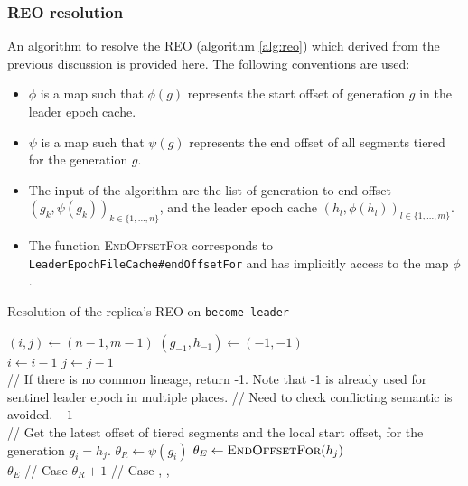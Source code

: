 \documentclass{article}
\newcommand*\circled[1]{\tikz[baseline=(char.base)]{
		\node[shape=circle,draw,inner sep=1pt] (char) {#1};}}
\begin{document}
\subsubsection{REO resolution}

An algorithm to resolve the REO (algorithm \ref{alg:reo}) which derived from the previous discussion is provided here. The following conventions are used:

\begin{itemize}
	\item $\phi$ is a map such that $\phi(g)$ represents the start offset of generation $g$ in the leader epoch cache.
	\item $\psi$ is a map such that $\psi(g)$ represents the end offset of all segments tiered for the generation $g$.
	\item The input of the algorithm are the list of generation to end offset $(g_k, \psi(g_k))_{k \in \{1,...,n\}}$, and the leader epoch cache $(h_l, \phi(h_l))_{l \in \{1,...,m\}}$.
	\item The function \textsc{EndOffsetFor} corresponds to \texttt{LeaderEpochFileCache\#endOffsetFor} and has implicitly access to the map $\phi$.
\end{itemize} 

\begin{algorithm}[h!]
	\caption{Resolution of the replica's REO on \texttt{become-leader}}
	\label{alg:reo}
	
	\begin{algorithmic}[1]
			\State	$(i,j) \leftarrow (n-1,m-1)$
			\State	$(g_{-1}, h_{-1}) \leftarrow (-1,-1)$
			\\
					\State $i \leftarrow i - 1$
				\EndWhile
					\State $j \leftarrow j - 1$
				\EndWhile
			\EndWhile
			\\
			\State // If there is no common lineage, return -1. Note that -1 is already used for sentinel leader epoch in multiple places.
			\State // Need to check conflicting semantic is avoided.
				\State \Return $-1$
			\EndIf
			\\
			\State // Get the latest offset of tiered segments and the local start offset, for the generation $g_i = h_j$.
			\State $\theta_R \leftarrow \psi(g_i)$
			\State $\theta_E \leftarrow  \textsc{EndOffsetFor}(h_j)$
			\\
			\State \Return $\theta_E$ // Case \circled{C}
			\Else
			\State \Return $\theta_R + 1$ // Case \circled{A}, \circled{B}, \circled{D}
			\EndIf
			\\
		\EndFunction
	\end{algorithmic}	
\end{algorithm}
\end{document}
